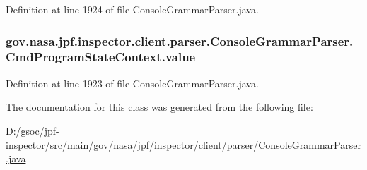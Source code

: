 Definition at line 1924 of file Console\+Grammar\+Parser.\+java.

\subsubsection[{\texorpdfstring{value}{value}}]{ gov.\+nasa.\+jpf.\+inspector.\+client.\+parser.\+Console\+Grammar\+Parser.\+Cmd\+Program\+State\+Context.\+value}\hypertarget{classgov_1_1nasa_1_1jpf_1_1inspector_1_1client_1_1parser_1_1_console_grammar_parser_1_1_cmd_program_state_context_ac1826edf5b118a80bfefbbbf4ab0792b}{}\label{classgov_1_1nasa_1_1jpf_1_1inspector_1_1client_1_1parser_1_1_console_grammar_parser_1_1_cmd_program_state_context_ac1826edf5b118a80bfefbbbf4ab0792b}


Definition at line 1923 of file Console\+Grammar\+Parser.\+java.



The documentation for this class was generated from the following file\+:\begin{DoxyCompactItemize}
\item 
D\+:/gsoc/jpf-\/inspector/src/main/gov/nasa/jpf/inspector/client/parser/\hyperlink{_console_grammar_parser_8java}{Console\+Grammar\+Parser.\+java}\end{DoxyCompactItemize}
